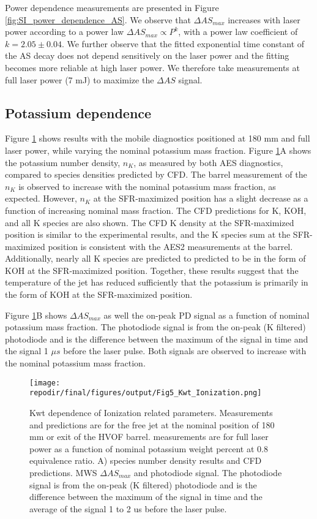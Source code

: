Power dependence measurements are presented in Figure \ref*{fig:SI_power_dependence_AS}. We observe that $\Delta AS_{max}$ increases with laser power according to a power law $\Delta AS_{max} \propto P^{k}$, with a power law coefficient of $k = 2.05 \pm 0.04$. We further observe that the fitted exponential time constant of the AS decay does not depend sensitively on the laser power and the fitting becomes more reliable at high laser power. We therefore take measurements at full laser power (7 mJ) to maximize the $\Delta AS$ signal.


\clearpage

\subsection{Potassium dependence}

Figure \ref{fig:kwt_ionization} shows results with the mobile diagnostics positioned at 180 mm and full laser power, while varying the nominal potassium mass fraction. Figure \ref{fig:kwt_ionization}A shows the potassium number density, $n_K$, as measured by both AES diagnostics, compared to species densities predicted by CFD. The barrel measurement of the $n_K$ is observed to increase with the nominal potassium mass fraction, as expected. However, $n_K$ at the SFR-maximized position has a slight decrease as a function of increasing nominal mass fraction. The CFD predictions for K, KOH, and all K species are also shown.  The CFD K density at the SFR-maximized position is similar to the experimental results, and the K species sum at the SFR-maximized position is consistent with the AES2 measurements at the barrel. Additionally, nearly all K species are predicted to predicted to be in the form of KOH at the SFR-maximized position. Together, these results suggest that the temperature of the jet has reduced sufficiently that the potassium is primarily in the form of KOH at the SFR-maximized position.

Figure  \ref{fig:kwt_ionization}B shows $\Delta AS_{max}$ as well the on-peak PD signal as a function of nominal potassium mass fraction. The photodiode signal is from the on-peak (K filtered) photodiode and is the difference between the maximum of the signal in time and the signal 1 $\mu s$ before the laser pulse. Both signals are observed to increase with the nominal potassium mass fraction. 

\begin{figure}[h]
    \centering
    \texttt{[image: \\repodir/final/figures/output/Fig5\_Kwt\_Ionization.png]} 
    \caption{Kwt dependence of Ionization related parameters. Measurements and predictions are for the free jet at the nominal position of 180 mm or exit of the HVOF barrel. measurements are for full laser power as a function of nominal potassium weight percent at 0.8 equivalence ratio. A) species number density results and CFD predictions. MWS $\Delta AS_{max}$ and photodiode signal. The photodiode signal is from the on-peak (K filtered) photodiode and is the difference between the maximum of the signal in time and the average of the signal 1 to 2 us before the laser pulse.  }
    \label{fig:kwt_ionization}
\end{figure}


